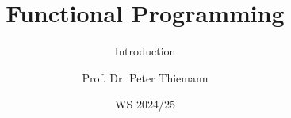 
\title{Functional Programming}
\subtitle{Introduction}

\author[Peter Thiemann]{Prof. Dr. Peter Thiemann}
\date{WS 2024/25}

